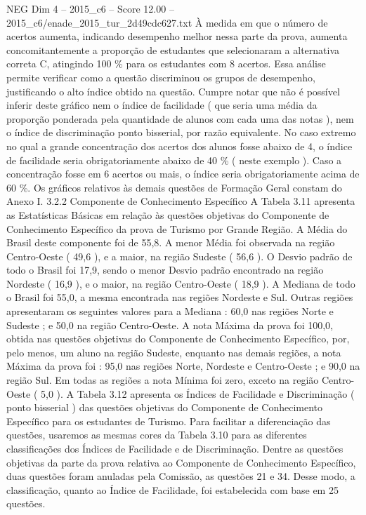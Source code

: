 \begin{textsample}{NEG Dim 4 – 2015\_c6 – Score 12.00 – 2015\_c6/enade\_2015\_tur\_2d49cdc627.txt}
À medida em que o número de acertos aumenta, indicando desempenho melhor nessa parte da prova, aumenta concomitantemente a proporção de estudantes que selecionaram a alternativa correta C, atingindo 100 \% para os estudantes com 8 acertos.
Essa análise permite verificar como a questão discriminou os grupos de desempenho, justificando o alto índice obtido na questão.
Cumpre notar que não é possível inferir deste gráfico nem o índice de facilidade ( que seria uma média da proporção ponderada pela quantidade de alunos com cada uma das notas ), nem o índice de discriminação ponto bisserial, por razão equivalente.
No caso extremo no qual a grande concentração dos acertos dos alunos fosse abaixo de 4, o índice de facilidade seria obrigatoriamente abaixo de 40 \% ( neste exemplo ).
Caso a concentração fosse em 6 acertos ou mais, o índice seria obrigatoriamente acima de 60 \%.
Os gráficos relativos às demais questões de Formação Geral constam do Anexo I. 3.2.2 Componente de Conhecimento Específico A Tabela 3.11 apresenta as Estatísticas Básicas em relação às questões objetivas do Componente de Conhecimento Específico da prova de Turismo por Grande Região.
A Média do Brasil deste componente foi de 55,8.
A menor Média foi observada na região Centro-Oeste ( 49,6 ), e a maior, na região Sudeste ( 56,6 ).
O Desvio padrão de todo o Brasil foi 17,9, sendo o menor Desvio padrão encontrado na região Nordeste ( 16,9 ), e o maior, na região Centro-Oeste ( 18,9 ).
A Mediana de todo o Brasil foi 55,0, a mesma encontrada nas regiões Nordeste e Sul.
Outras regiões apresentaram os seguintes valores para a Mediana : 60,0 nas regiões Norte e Sudeste ; e 50,0 na região Centro-Oeste.
A nota Máxima da prova foi 100,0, obtida nas questões objetivas do Componente de Conhecimento Específico, por, pelo menos, um aluno na região Sudeste, enquanto nas demais regiões, a nota Máxima da prova foi : 95,0 nas regiões Norte, Nordeste e Centro-Oeste ; e 90,0 na região Sul.
Em todas as regiões a nota Mínima foi zero, exceto na região Centro-Oeste ( 5,0 ).
A Tabela 3.12 apresenta os Índices de Facilidade e Discriminação ( ponto bisserial ) das questões objetivas do Componente de Conhecimento Específico para os estudantes de Turismo.
Para facilitar a diferenciação das questões, usaremos as mesmas cores da Tabela 3.10 para as diferentes classificações dos Índices de Facilidade e de Discriminação.
Dentre as questões objetivas da parte da prova relativa ao Componente de Conhecimento Específico, duas questões foram anuladas pela Comissão, as questões 21 e 34.
Desse modo, a classificação, quanto ao Índice de Facilidade, foi estabelecida com base em 25 questões.

\end{textsample}
